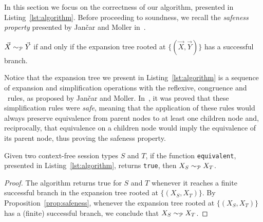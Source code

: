 In this section we focus on the correctness of our algorithm,
presented in Listing~\ref{lst:algorithm}.
Before proceeding to soundness, we recall the \emph{safeness property}
presented by Jan{\v{c}}ar and Moller in~\cite{janvcar1999techniques}.

\begin{proposition} 
\label{prop:safeness}
	$\vec X \sim_{\mathcal{P}} \vec Y$ if and only if the expansion tree rooted
	at $\{(\vec X, \vec Y)\}$ has a successful branch.
\end{proposition}

Notice that the expansion tree we present in Listing~\ref{lst:algorithm} is
a sequence of expansion and simplification operations with the reflexive,
congruence and \BPA\ rules, as proposed by Jan{\v{c}}ar and Moller.
In~\cite{janvcar1999techniques}, it was proved that these simplification
rules were \emph{safe}, meaning that the application of these rules would
always preserve equivalence from parent nodes to at least one children node
and, reciprocally, that equivalence on a children node would imply the
equivalence of its parent node, thus proving the safeness property.


\begin{theorem}
	Given two context-free session types $S$ and $T$, if the function
	\lstinline|equivalent|, presented in Listing~\ref{lst:algorithm},
	returns \lstinline|true|, then $X_{S} \sim_{\mathcal{P}} X_{T}$.
\end{theorem}

\begin{proof}
	The algorithm returns \textsf{true} for $S$ and $T$ whenever
	it reaches a finite successful branch in the expansion tree rooted
	at $\{(X_{S}, X_{T})\}$. By Proposition~\ref{prop:safeness}, whenever the
	expansion tree rooted at $\{(X_{S}, X_{T})\}$ has a (finite)
	successful branch, we conclude that $X_{S} \sim_{\mathcal{P}} X_{T}$.
\end{proof}

